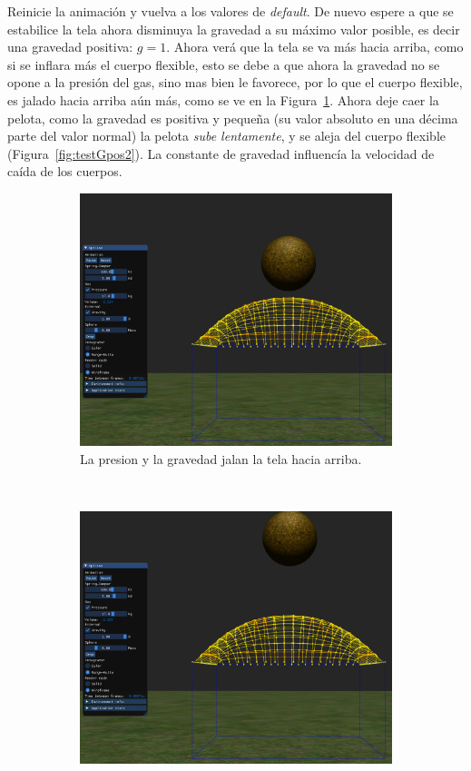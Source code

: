Reinicie la animación y vuelva a los valores de \emph{\textenglish{default}}.
De nuevo espere a que se estabilice la tela ahora disminuya la gravedad a su máximo valor posible, es decir una gravedad positiva: $g=1$.
Ahora verá que la tela se va más hacia arriba, como si se inflara más el cuerpo flexible, esto se debe a que ahora la gravedad no se opone a la presión del gas, sino mas bien le favorece, por lo que el cuerpo flexible, es jalado hacia arriba aún más, como se ve en la Figura~\ref{fig:testGpos1}.
Ahora deje caer la pelota, como la gravedad es positiva y pequeña (su valor absoluto en una décima parte del valor normal) la pelota \emph{sube lentamente}, y se aleja del cuerpo flexible (Figura~\ref{fig:testGpos2}).
La constante de gravedad influencía la velocidad de caída de los cuerpos.

\begin{figure}
 \centering
  \begin{subfigure}[b]{0.45\textwidth}
    \includegraphics[width=\textwidth]{Img/04/positiveGravity1}
    \caption{La presion y la gravedad jalan la tela hacia arriba.}
    \label{fig:testGpos1}
  \end{subfigure}
~
  \begin{subfigure}[b]{0.45\textwidth}
    \includegraphics[width=\textwidth]{Img/04/positiveGravity2}

\end{subfigure}
\end{figure}

